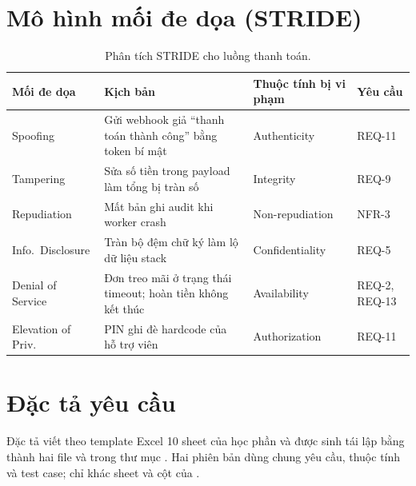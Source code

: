 \section{Mô hình mối đe dọa (STRIDE)}
\begin{table}[H]
\centering\small
\caption{Phân tích STRIDE cho luồng thanh toán.}
\label{tab:stride}
\begin{tabularx}{\linewidth}{@{}l X l l@{}}
\toprule
Mối đe dọa & Kịch bản & Thuộc tính bị vi phạm & Yêu cầu \\
\midrule
Spoofing & Gửi webhook giả ``thanh toán thành công'' bằng token bí mật & Authenticity & REQ-11 \\
Tampering & Sửa số tiền trong payload làm tổng bị tràn số & Integrity & REQ-9 \\
Repudiation & Mất bản ghi audit khi worker crash & Non-repudiation & NFR-3 \\
Info.\ Disclosure & Tràn bộ đệm chữ ký làm lộ dữ liệu stack & Confidentiality & REQ-5 \\
Denial of Service & Đơn treo mãi ở trạng thái timeout; hoàn tiền không kết thúc & Availability & REQ-2, REQ-13 \\
Elevation of Priv. & PIN ghi đè hardcode của hỗ trợ viên & Authorization & REQ-11 \\
\bottomrule
\end{tabularx}
\end{table}

\section{Đặc tả yêu cầu}
Đặc tả viết theo template Excel 10 sheet của học phần và được sinh tái lập bằng
 thành hai file
 và  trong thư mục
.
Hai phiên bản dùng chung yêu cầu, thuộc tính và test case; chỉ khác sheet
 và cột  của .

